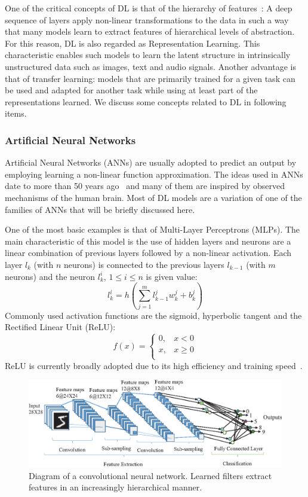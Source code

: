 \documentclass[12pt]{article}
\begin{document}
One of the critical concepts of DL is that of the hierarchy of features~\cite{ref:dl}:
A deep sequence of layers apply non-linear transformations to the data
in such a way that many models learn to extract features of hierarchical
levels of abstraction.
For this reason, DL is also regarded as Representation Learning.
This characteristic enables such models to learn the latent structure
in intrinsically unstructured data such as images, text and audio signals.
Another advantage is that of transfer learning: models that are
primarily trained for a given task can be used and adapted for another
task while using at least part of the representations learned.
We discuss some concepts related to DL in following items.

\subsubsection{Artificial Neural Networks}
Artificial Neural Networks (ANNs) are usually adopted to predict
an output by employing learning a non-linear function approximation.
The ideas used in ANNs date to more than 50 years ago~\cite{ref:perceptron} and many of them
are inspired by observed mechanisms of the human brain.
Most of DL models are a variation of one of the families of ANNs
that will be briefly discussed here.

One of the most basic examples is that of Multi-Layer Perceptrons (MLPs).
The main characteristic of this model is the use of hidden layers
and neurons are a linear combination of previous layers followed by
a non-linear activation.
Each layer $l_k$ (with $n$ neurons) is connected to the previous layers
$l_{k-1}$ (with $m$ neurons) and the neuron $l_k^i$, $1 \le i \le n$
is given value:
$$l_k^i = h\left(\sum_{j=1}^{m} l_{k-1}^jw_k^j + b_k^j\right)$$
Commonly used activation functions are the sigmoid, hyperbolic tangent
and the Rectified Linear Unit (ReLU):
$$f(x) = \begin{cases}
    0, & x < 0 \\
    x, & x \ge 0 \\
        \end{cases}
$$
ReLU is currently broadly adopted due to its high efficiency
and training speed~\cite{ref:relu}.

\begin{figure}
\begin{center}
    \includegraphics[width=0.9\linewidth]{./img/cnn2.png}
\caption{
    Diagram of a convolutional neural network.
    Learned filters extract features in an increasingly hierarchical manner.
}
\label{fig:cnn}
\end{center}
\end{figure}
\end{document}
